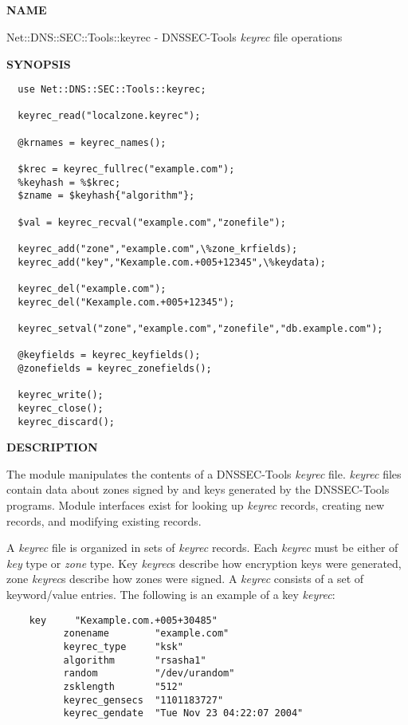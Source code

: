 \clearpage

\subsection{}

{\bf NAME}

Net::DNS::SEC::Tools::keyrec - DNSSEC-Tools {\it keyrec} file operations

{\bf SYNOPSIS}

\begin{verbatim}
  use Net::DNS::SEC::Tools::keyrec;

  keyrec_read("localzone.keyrec");

  @krnames = keyrec_names();

  $krec = keyrec_fullrec("example.com");
  %keyhash = %$krec;
  $zname = $keyhash{"algorithm"};

  $val = keyrec_recval("example.com","zonefile");

  keyrec_add("zone","example.com",\%zone_krfields);
  keyrec_add("key","Kexample.com.+005+12345",\%keydata);

  keyrec_del("example.com");
  keyrec_del("Kexample.com.+005+12345");

  keyrec_setval("zone","example.com","zonefile","db.example.com");

  @keyfields = keyrec_keyfields();
  @zonefields = keyrec_zonefields();

  keyrec_write();
  keyrec_close();
  keyrec_discard();
\end{verbatim}

{\bf DESCRIPTION}

The  module manipulates the contents of
a DNSSEC-Tools {\it keyrec} file.  {\it keyrec} files contain data about
zones signed by and keys generated by the DNSSEC-Tools programs.  Module
interfaces exist for looking up {\it keyrec} records, creating new
records, and modifying existing records.

A {\it keyrec} file is organized in sets of {\it keyrec} records.  Each
{\it keyrec} must be either of {\it key} type or {\it zone} type.  Key
{\it keyrec}s describe how encryption keys were generated, zone {\it keyrec}s
describe how zones were signed.  A {\it keyrec} consists of a set of
keyword/value entries.  The following is an example of a key {\it keyrec}:

\begin{verbatim}
    key     "Kexample.com.+005+30485"
          zonename        "example.com"
          keyrec_type     "ksk"
          algorithm       "rsasha1"
          random          "/dev/urandom"
          zsklength       "512"
          keyrec_gensecs  "1101183727"
          keyrec_gendate  "Tue Nov 23 04:22:07 2004"
\end{verbatim}

